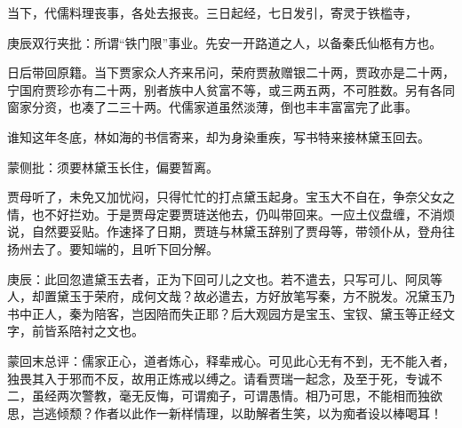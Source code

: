 \begin{parag}
    当下，代儒料理丧事，各处去报丧。三日起经，七日发引，寄灵于铁槛寺，\begin{note}庚辰双行夹批：所谓“铁门限”事业。先安一开路道之人，以备秦氏仙柩有方也。\end{note}日后带回原籍。当下贾家众人齐来吊问，荣府贾赦赠银二十两，贾政亦是二十两，宁国府贾珍亦有二十两，别者族中人贫富不等，或三两五两，不可胜数。另有各同窗家分资，也凑了二三十两。代儒家道虽然淡薄，倒也丰丰富富完了此事。
\end{parag}


\begin{parag}
    谁知这年冬底，林如海的书信寄来，却为身染重疾，写书特来接林黛玉回去。\begin{note}蒙侧批：须要林黛玉长住，偏要暂离。\end{note}贾母听了，未免又加忧闷，只得忙忙的打点黛玉起身。宝玉大不自在，争奈父女之情，也不好拦劝。于是贾母定要贾琏送他去，仍叫带回来。一应土仪盘缠，不消烦说，自然要妥贴。作速择了日期，贾琏与林黛玉辞别了贾母等，带领仆从，登舟往扬州去了。要知端的，且听下回分解。
\end{parag}


\begin{parag}
    \begin{note}庚辰：此回忽遣黛玉去者，正为下回可儿之文也。若不遣去，只写可儿、阿凤等人，却置黛玉于荣府，成何文哉？故必遣去，方好放笔写秦，方不脱发。况黛玉乃书中正人，秦为陪客，岂因陪而失正耶？后大观园方是宝玉、宝钗、黛玉等正经文字，前皆系陪衬之文也。\end{note}
\end{parag}


\begin{parag}
    \begin{note}蒙回末总评：儒家正心，道者炼心，释辈戒心。可见此心无有不到，无不能入者，独畏其入于邪而不反，故用正炼戒以缚之。请看贾瑞一起念，及至于死，专诚不二，虽经两次警教，毫无反悔，可谓痴子，可谓愚情。相乃可思，不能相而独欲思，岂逃倾颓？作者以此作一新样情理，以助解者生笑，以为痴者设以棒喝耳！\end{note}
\end{parag}